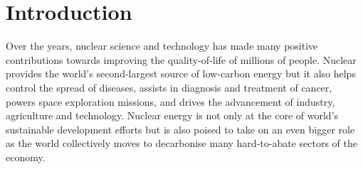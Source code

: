 \chapter{Introduction} \label{chap:introduction}


Over the years, nuclear science and technology has made many positive contributions towards improving the quality-of-life of millions of people. Nuclear provides the world's second-largest source of low-carbon energy but it also helps control the spread of diseases, assists in diagnosis and treatment of cancer, powers space exploration missions, and drives the advancement of industry, agriculture and technology. Nuclear energy is not only at the core of world's sustainable development efforts but is also poised to take on an even bigger role as the world collectively moves to decarbonise many hard-to-abate sectors of the economy. 


